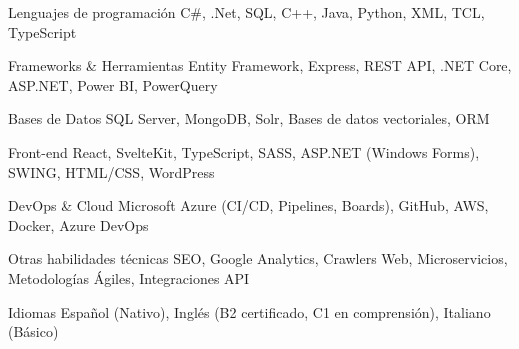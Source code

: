 
\begin{cvskills}
    \cvskill
    {Lenguajes de programación} %
    {C\#, .Net, SQL, C++, Java, Python, XML, TCL, TypeScript} %

    \cvskill
    {Frameworks \& Herramientas} %
    {Entity Framework, Express, REST API, .NET Core, ASP.NET, Power BI, PowerQuery} %

    \cvskill
    {Bases de Datos} %
    {SQL Server, MongoDB, Solr, Bases de datos vectoriales, ORM} %

    \cvskill
    {Front-end} %
    {React, SvelteKit, TypeScript, SASS, ASP.NET (Windows Forms), SWING, HTML/CSS, WordPress} %

    \cvskill
    {DevOps \& Cloud} %
    {Microsoft Azure (CI/CD, Pipelines, Boards), GitHub, AWS, Docker, Azure DevOps} %

    \cvskill
    {Otras habilidades técnicas} %
    {SEO, Google Analytics, Crawlers Web, Microservicios, Metodologías Ágiles, Integraciones API} %

    \cvskill
    {Idiomas} %
    {Español (Nativo), Inglés (B2 certificado, C1 en comprensión), Italiano (Básico)} %

\end{cvskills}